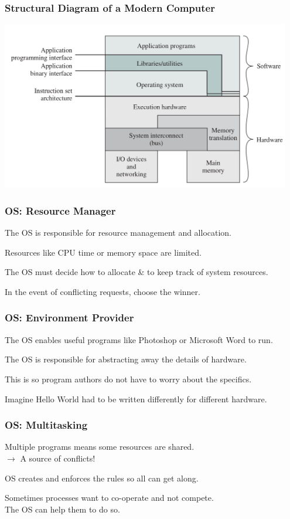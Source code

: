\begin{frame}
\frametitle{Structural Diagram of a Modern Computer}

\begin{center}
\includegraphics[width=0.95\textwidth]{images/os-sw-hw.png}
\end{center}

\end{frame}


\begin{frame}
\frametitle{OS: Resource Manager}

The OS is responsible for resource management and allocation.

Resources like CPU time or memory space are limited.

The OS must decide how to allocate \& to keep track of system resources.

In the event of conflicting requests, choose the winner.


\end{frame}

\begin{frame}
\frametitle{OS: Environment Provider}

The OS enables useful programs like Photoshop or Microsoft Word to run. 

The OS is responsible for abstracting away the details of hardware.

This is so program authors do not have to worry about the specifics.

Imagine Hello World had to be written differently for different hardware.


\end{frame}

\begin{frame}
\frametitle{OS: Multitasking}
Multiple programs means some resources are shared.\\
\quad $\rightarrow$ A source of conflicts!

OS creates and enforces the rules so all can get along.

Sometimes processes want to co-operate and not compete.\\
\quad The OS can help them to do so.


\end{frame}

